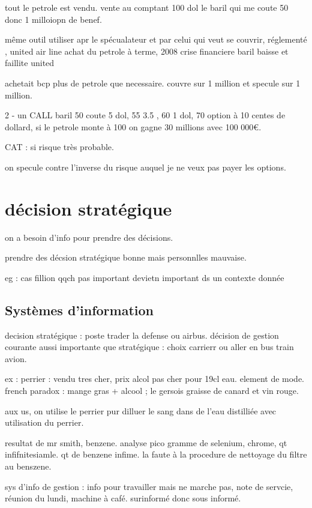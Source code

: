 \documentclass[a4paper,12pt]{article}
\begin{document}
tout le petrole est vendu. vente au comptant 100 dol le baril qui me coute 50  donc 1 milloiopn de benef.

même outil utiliser apr le spécualateur et par celui qui veut se couvrir, 
réglementé , united air line achat du petrole à terme, 2008 crise financiere baril baisse et faillite united

achetait bcp plus de petrole que necessaire. couvre sur 1 million et specule sur 1 million.

2 - un CALL baril 50  coute 5 dol, 55 3.5 , 60 1 dol, 70 option à 10 centes de dollard,
si le petrole monte à 100 on gagne 30 millions avec 100 000€. 

CAT : si risque très probable.

on specule contre l'inverse du risque auquel 
je ne veux pas payer les options.


\section{décision stratégique}

on a besoin d'info pour prendre des décisions.

prendre des décsion stratégique bonne mais personnlles mauvaise.

eg : cas fillion qqch pas important devietn important ds un contexte donnée


\subsection{Systèmes d'information}

decision stratégique : poste trader la defense ou airbus.
décision de gestion courante aussi importante que stratégique : choix carrierr ou aller en bus train avion.


ex : perrier : vendu tres cher, prix alcol pas cher pour 19cl eau. element de mode.
french paradox : mange gras + alcool ; le gersois graisse de canard et vin rouge.

aux us, on utilise le perrier pur dilluer le sang dans de l'eau distilliée avec utilisation du perrier.

resultat de mr smith, benzene. 
analyse pico gramme de selenium, chrome, qt infifnitesiamle.
qt de benzene infime.
la faute à la procedure de nettoyage du filtre au benszene.

sys d'info de gestion : info pour travailler mais ne marche pas,
note de servcie, réunion du lundi, machine à café. surinformé donc sous informé.
\end{document}
